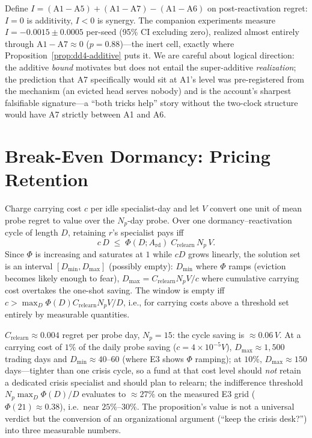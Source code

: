 \begin{remark}
Define $I = (\text{A1} - \text{A5}) + (\text{A1} - \text{A7}) -
(\text{A1} - \text{A6})$ on post-reactivation regret: $I = 0$ is
additivity, $I < 0$ is synergy. The companion experiments measure
$I = -0.0015 \pm 0.0005$ per-seed (95\% CI excluding zero), realized
almost entirely through $\text{A1} - \text{A7} \approx 0$
($p = 0.88$)---the inert cell, exactly where
Proposition~\ref{prop:dd4-additive} puts it. We are careful about
logical direction: the additive \emph{bound} motivates but does not
entail the super-additive \emph{realization}; the prediction that A7
specifically would sit at A1's level was pre-registered from the
mechanism (an evicted head serves nobody) and is the account's sharpest
falsifiable signature---a ``both tricks help'' story without the
two-clock structure would have A7 strictly between A1 and A6.
\end{remark}

\section{Break-Even Dormancy: Pricing Retention}
\label{sec:dd4-breakeven}

\begin{proposition}
\label{prop:dd4-breakeven}
Charge carrying cost $c$ per idle specialist-day and let $V$ convert one
unit of mean probe regret to value over the $N_p$-day probe. Over one
dormancy--reactivation cycle of length $D$, retaining $r$'s specialist
pays iff
\[
  c\, D \;\le\; \Phi(D; A_{\mathrm{rd}})\;
  C_{\mathrm{relearn}}\, N_p\, V .
\]
Since $\Phi$ is increasing and saturates at $1$ while $cD$ grows
linearly, the solution set is an interval $[D_{\min}, D_{\max}]$
(possibly empty): $D_{\min}$ where $\Phi$ ramps (eviction becomes likely
enough to fear), $D_{\max} = C_{\mathrm{relearn}} N_p V / c$ where
cumulative carrying cost overtakes the one-shot saving. The window is
empty iff $c > \max_D \Phi(D) C_{\mathrm{relearn}} N_p V / D$, i.e.,
for carrying costs above a threshold set entirely by measurable
quantities.
\end{proposition}

\begin{example}
$C_{\mathrm{relearn}} \approx 0.004$ regret per probe day, $N_p = 15$:
the cycle saving is $\approx 0.06\, V$. At a carrying cost of $1\%$ of
the daily probe saving ($c = 4 \times 10^{-5} V$), $D_{\max} \approx
1{,}500$ trading days and $D_{\min} \approx 40$--$60$ (where E3 shows
$\Phi$ ramping); at $10\%$, $D_{\max} \approx 150$ days---tighter than
one crisis cycle, so a fund at that cost level should \emph{not} retain
a dedicated crisis specialist and should plan to relearn; the indifference
threshold $N_p \max_D \Phi(D)/D$ evaluates to $\approx 27\%$ on the
measured E3 grid ($\Phi(21) \approx 0.38$), i.e.\ near $25\%$--$30\%$. The proposition's value is not a universal
verdict but the conversion of an organizational argument
(``keep the crisis desk?'') into three measurable numbers.
\end{example}

